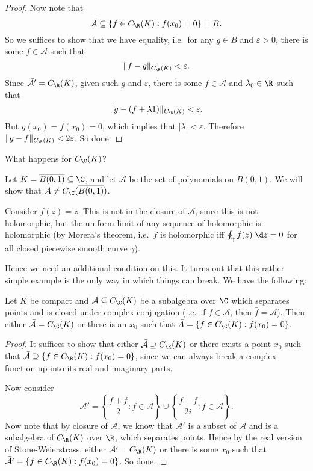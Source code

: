 \documentclass[a4paper]{article}
\begin{document}
\begin{proof}
  Now note that
  \[
    \bar{\mathcal{A}} \subseteq \{f \in C_\R(K): f(x_0) = 0\} = B.
  \]
  So we suffices to show that we have equality, i.e.\ for any $g \in B$ and $\varepsilon > 0$, there is some $f \in \mathcal{A}$ such that
  \[
    \|f - g\|_{C_\R(K)} < \varepsilon.
  \]
  Since $\bar{\mathcal{A}}' = C_\R(K)$, given such $g$ and $\varepsilon$, there is some $f \in \mathcal{A}$ and $\lambda_0 \in \R$ such that
  \[
    \|g - (f + \lambda 1)\|_{C_{\R}(K)} < \varepsilon.
  \]
  But $g(x_0) = f(x_0) = 0$, which implies that $|\lambda| < \varepsilon$. Therefore $\|g - f\|_{C_\R(K)} < 2 \varepsilon$. So done.
\end{proof}

What happens for $C_\C(K)$?
\begin{eg}
  Let $K = \overline{B(0, 1)} \subseteq \C$, and let $\mathcal{A}$ be the set of polynomials on $\overline{B(0, 1)}$. We will show that $\bar{\mathcal{A}} \not= C_{\C}(\overline{B(0, 1)})$.

  Consider $f(z) = \bar{z}$. This is not in the closure of $\mathcal{A}$, since this is not holomorphic, but the uniform limit of any sequence of holomorphic is holomorphic (by Morera's theorem, i.e.\ $f$ is holomorphic iff $\oint_\gamma f(z) \;\d z = 0$ for all closed piecewise smooth curve $\gamma$).
\end{eg}
Hence we need an additional condition on this. It turns out that this rather simple example is the only way in which things can break. We have the following:

\begin{thm}
  Let $K$ be compact and $\mathcal{A} \subseteq C_\C(K)$ be a subalgebra over $\C$ which separates points and is closed under complex conjugation (i.e.\ if $f \in \mathcal{A}$, then $\bar{f} = \mathcal{A}$). Then either $\bar{\mathcal{A}} = C_\C(K)$ or these is an $x_0$ such that $\bar{A} = \{f \in C_\C(K): f(x_0) = 0\}$.
\end{thm}

\begin{proof}
  It suffices to show that either $\bar{\mathcal{A}} \supseteq C_{\R}(K)$ or there exists a point $x_0$ such that $\bar{\mathcal{A}} \supseteq \{f \in C_{\R}(K): f(x_0) = 0\}$, since we can always break a complex function up into its real and imaginary parts.

  Now consider
  \[
    \mathcal{A}' = \left\{\frac{f + \bar{f}}{2}: f \in \mathcal{A}\right\} \cup \left\{\frac{f - \bar{f}}{2i}: f \in \mathcal{A}\right\}.
  \]
  Now note that by closure of $\mathcal{A}$, we know that $\mathcal{A}'$ is a subset of $\mathcal{A}$ and is a subalgebra of $C_\R(K)$ over $\R$, which separates points. Hence by the real version of Stone-Weierstrass, either $\bar{\mathcal{A}'} = C_\R(K)$ or there is some $x_0$ such that $\bar{\mathcal{A}'} = \{f \in C_\R(K): f(x_0) = 0\}$. So done.
\end{proof}
\end{document}

